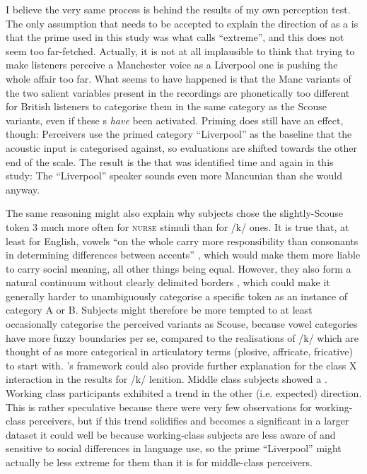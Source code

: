 \newpage 
I believe the very same process is behind the results of my own perception test.
The only assumption that needs to be accepted to explain the direction of  as a  is that the prime used in this study was what \citeauthor{herr1986} calls ``extreme'', and this does not seem too far-fetched.
Actually, it is not at all implausible to think that trying to make listeners perceive a Manchester voice as a Liverpool one is pushing the whole affair too far.
What seems to have happened is that the Manc variants of the two salient variables present in the recordings are phonetically too different for British listeners to categorise them in the same category as the Scouse variants, even if these s \emph{have} been activated.
Priming does still have an effect, though: Perceivers use the primed category ``Liverpool'' as the baseline that the acoustic input is categorised against, so evaluations are shifted towards the other end of the scale.
The result is the  that was identified time and again in this study: The ``Liverpool'' speaker sounds even more Mancunian than she would anyway.

The same reasoning might also explain why subjects chose the slightly-Scouse token 3 much more often for \textsc{nurse} stimuli than for /k/ ones.
It is true that, at least for English, vowels ``on the whole carry more responsibility than consonants in determining differences between accents'' \parencite[12]{foulkesdocherty1999a}, which would make them more liable to carry social meaning, all other things being equal.
However, they also form a natural continuum without clearly delimited borders \parencite[cf.][12]{foulkesdocherty1999a}, which could make it generally harder to unambiguously categorise a specific token as an instance of category A or B.
Subjects might therefore be more tempted to at least occasionally categorise the perceived variants as Scouse, because vowel categories have more fuzzy boundaries per se, compared to the realisations of /k/ which are thought of as more categorical in articulatory terms (plosive, affricate, fricative) to start with.
\citeauthor{herr1986}'s framework could also provide further explanation for the class X  interaction in the results for /k/ lenition.
Middle class subjects showed a .
Working class participants exhibited a trend in the other (i.e. expected) direction.
This is rather speculative because there were very few observations for working-class perceivers, but if this trend solidifies and becomes a significant  in a larger dataset it could well be because working-class subjects are less aware of and sensitive to social differences in language use, so the prime ``Liverpool'' might actually be less extreme for them than it is for middle-class perceivers.

